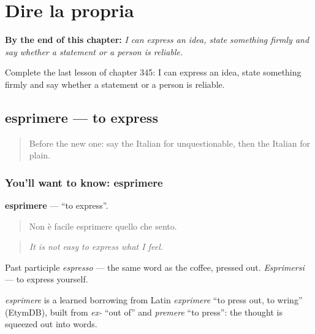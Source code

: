 
\chapter{Dire la propria}
\label{ch:it-dire-la-propria}

\begin{chapteropening}
\textbf{By the end of this chapter:} \emph{I can express an idea, state something firmly and say whether a statement or a person is reliable.}

Complete the last lesson of chapter 345: I can express an idea, state something firmly and say whether a statement or a person is reliable.
\end{chapteropening}

\section[esprimere]{esprimere — to express}

\label{lesson:IT-C345-esprimere}



\begin{quote}
Before the new one: say the Italian for unquestionable, then the Italian for plain.
\end{quote}

\subsection*{You'll want to know: esprimere}
\textbf{esprimere} — \textquotedblleft{}to express\textquotedblright{}.

\begin{quote}
Non è facile esprimere quello che sento.
\end{quote}

\begin{quote}
\emph{It is not easy to express what I feel.}
\end{quote}

Past participle \emph{espresso} — the same word as the coffee, pressed out. \emph{Esprimersi} — to express yourself.

\begin{cousinweb}
\emph{esprimere} is a learned borrowing from Latin \emph{exprimere} \textquotedblleft{}to press out, to wring\textquotedblright{} (EtymDB), built from \emph{ex-} \textquotedblleft{}out of\textquotedblright{} and \emph{premere} \textquotedblleft{}to press\textquotedblright{}: the thought is squeezed out into words.
\end{cousinweb}

